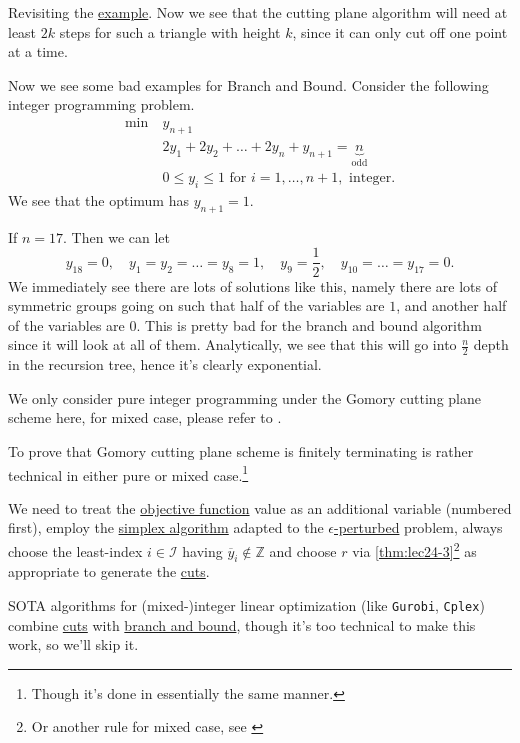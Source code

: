 Revisiting the \hyperref[eg:branch-and-bound]{example}. Now we see that the cutting plane algorithm will need at least \(2k\) steps for such a triangle with height \(k\), since it can only cut off one point at a time.

\begin{eg}
	Now we see some bad examples for Branch and Bound. Consider the following integer programming problem.
	\[
		\begin{aligned}
			\min~ & y_{n+1}                                                              \\
			      & 2y_{1} + 2y_2 + \ldots +2y_n + y_{n+1} = \underbrace{n}_{\text{odd}} \\
			      & 0\leq y_{i}\leq 1 \text{ for }i = 1, \ldots , n+1, \text{ integer}.
		\end{aligned}
	\]
	We see that the optimum has \(y_{n+1} = 1\).

	If \(n = 17\). Then we can let
	\[
		y_{18} = 0,\quad y_1 = y_2 = \ldots = y_8 = 1,\quad y_9 = \frac{1}{2},\quad y_{10} = \ldots = y_{17} = 0.
	\]
	We immediately see there are lots of solutions like this, namely there are lots of symmetric groups going on such that half of the variables are \(1\), and another half of the variables are \(0\). This is pretty bad for the branch and bound algorithm since it will look at all of them. Analytically, we see that this will go into \(\frac{n}{2}\) depth in the recursion tree, hence it's clearly exponential.
\end{eg}

\begin{remark}
	We only consider pure integer programming under the Gomory cutting plane scheme here, for mixed case, please refer to \cite{Linear-Opt}.
\end{remark}

\begin{remark}
	To prove that Gomory cutting plane scheme is finitely terminating is rather technical in either pure or mixed case.\footnote{Though it's done in essentially the same manner.}

	We need to treat the \hyperref[def:objective-function]{objective function} value as an additional variable (numbered first), employ the \hyperref[algo:simplex-algorithm]{simplex algorithm} adapted to the \hyperref[def:perturbed-problem]{\(\epsilon \)-perturbed} problem, always choose the least-index \(i\in \mathcal{I} \) having \(\overline{y} _i \notin \mathbb{Z} \) and choose \(r\) via \autoref{thm:lec24-3}\footnote{Or another rule for mixed case, see \cite{Linear-Opt}} as appropriate to generate the \hyperref[def:Chvatal-Gomory-cut]{cuts}.
\end{remark}

\begin{remark}
	SOTA algorithms for (mixed-)integer linear optimization (like \texttt{Gurobi}, \texttt{Cplex}) combine \hyperref[def:Chvatal-Gomory-cut]{cuts} with \hyperref[algo:branch-and-bound-algorithm]{branch and bound}, though it's too technical to make this work, so we'll skip it.
\end{remark}